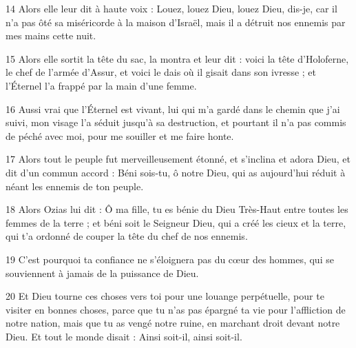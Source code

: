\par 14 Alors elle leur dit à haute voix : Louez, louez Dieu, louez Dieu, dis-je, car il n'a pas ôté sa miséricorde à la maison d'Israël, mais il a détruit nos ennemis par mes mains cette nuit.
\par 15 Alors elle sortit la tête du sac, la montra et leur dit : voici la tête d'Holoferne, le chef de l'armée d'Assur, et voici le dais où il gisait dans son ivresse ; et l'Éternel l'a frappé par la main d'une femme.
\par 16 Aussi vrai que l'Éternel est vivant, lui qui m'a gardé dans le chemin que j'ai suivi, mon visage l'a séduit jusqu'à sa destruction, et pourtant il n'a pas commis de péché avec moi, pour me souiller et me faire honte.
\par 17 Alors tout le peuple fut merveilleusement étonné, et s'inclina et adora Dieu, et dit d'un commun accord : Béni sois-tu, ô notre Dieu, qui as aujourd'hui réduit à néant les ennemis de ton peuple.
\par 18 Alors Ozias lui dit : Ô ma fille, tu es bénie du Dieu Très-Haut entre toutes les femmes de la terre ; et béni soit le Seigneur Dieu, qui a créé les cieux et la terre, qui t'a ordonné de couper la tête du chef de nos ennemis.
\par 19 C'est pourquoi ta confiance ne s'éloignera pas du cœur des hommes, qui se souviennent à jamais de la puissance de Dieu.
\par 20 Et Dieu tourne ces choses vers toi pour une louange perpétuelle, pour te visiter en bonnes choses, parce que tu n'as pas épargné ta vie pour l'affliction de notre nation, mais que tu as vengé notre ruine, en marchant droit devant notre Dieu. Et tout le monde disait : Ainsi soit-il, ainsi soit-il.


